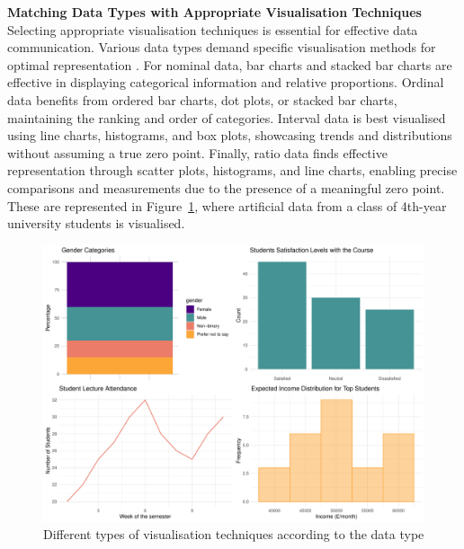 \documentclass{article}\usepackage[]{graphicx}\usepackage[]{xcolor}
\makeatletter
\def\maxwidth{ %
  \ifdim\Gin@nat@width>\linewidth
    \linewidth
  \else
    \Gin@nat@width
  \fi
}
\newenvironment{knitrout}{}{} %
\numberwithin{equation}{section}
\makeatother
\begin{document}
\noindent \textbf{Matching Data Types with Appropriate Visualisation Techniques}\\
\noindent Selecting appropriate visualisation techniques is essential for effective data communication. Various data types demand specific visualisation methods for optimal representation \cite{healy2018data}. For nominal data, bar charts and stacked bar charts are effective in displaying categorical information and relative proportions. Ordinal data benefits from ordered bar charts, dot plots, or stacked bar charts, maintaining the ranking and order of categories. Interval data is best visualised using line charts, histograms, and box plots, showcasing trends and distributions without assuming a true zero point. Finally, ratio data finds effective representation through scatter plots, histograms, and line charts, enabling precise comparisons and measurements due to the presence of a meaningful zero point. These are represented in Figure~\ref{fig:data-plots}, where artificial data from a class of 4th-year university students is visualised.

\begin{knitrout}\scriptsize
{}\color{fgcolor}\begin{figure}[H]

{\centering \includegraphics[width=\maxwidth]{figure/beamer-data-plots-1} 

}

\caption[Different types of visualisation techniques according to the data type]{Different types of visualisation techniques according to the data type}\label{fig:data-plots}
\end{figure}

\end{knitrout}
\end{document}
